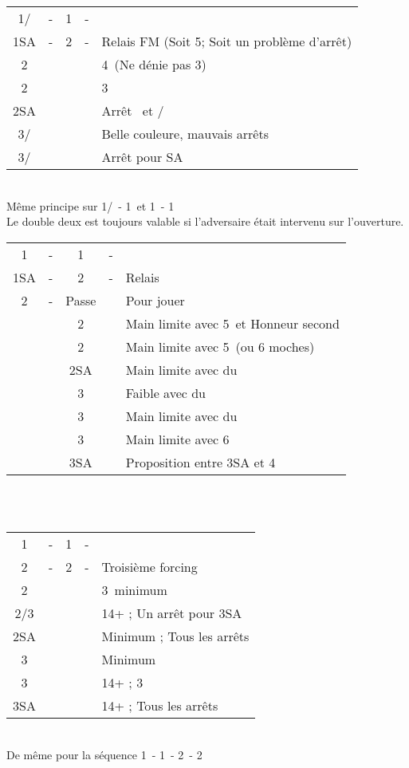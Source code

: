 \documentclass[a4paper, oneside, 11pt]{report}
\begin{document}
		\begin{tabular}{cccc|l}
		1\trefle/\carreau & - & 1\pique & - &\\
		1SA & - & 2\carreau & - & Relais FM (Soit 5\pique ; Soit un problème d'arrêt)\\
		2\coeur &&&& 4\coeur\ (Ne dénie pas 3\pique)\\
		2\pique &&&& 3\pique\\
		2SA &&&& Arrêt \coeur\ et \carreau/\trefle\\
		3\trefle/\carreau &&&& Belle couleure, mauvais arrêts\\
		3\carreau/\trefle &&&& Arrêt pour SA\\
		\end{tabular}\\
		Même principe sur 1\trefle/\carreau\ - 1\coeur\ et 1\coeur\ - 1\pique\\

		Le double deux est toujours valable si l'adversaire était intervenu sur l'ouverture. \\

		\begin{tabular}{cccc|l}
		1\coeur & - & 1\pique & - &\\
		1SA & - & 2\trefle & - & Relais\\
		2\carreau & - & Passe && Pour jouer\\
		&& 2\coeur && Main limite avec 5\pique\ et Honneur second \coeur\\
		&& 2\pique && Main limite avec 5\pique\ (ou 6 moches)\\
		&& 2SA && Main limite avec du \trefle\\
		&& 3\trefle && Faible avec du \trefle\\
		&& 3\carreau && Main limite avec du \carreau\\
		&& 3\pique && Main limite avec 6\pique\\
		&& 3SA && Proposition entre 3SA et 4\pique\\
		\end{tabular}\\\\
	
		\begin{tabular}{cccc|l}
		1\trefle & - & 1\coeur & - &\\
		2\trefle & - & 2\carreau & - & Troisième forcing\\
		2\coeur &&&& 3\coeur\ minimum\\
		2\pique/3\carreau &&&& 14+ ; Un arrêt pour 3SA\\
		2SA &&&& Minimum ; Tous les arrêts\\
		3\trefle &&&& Minimum\\
		3\coeur &&&& 14+ ; 3\coeur\\
		3SA &&&& 14+ ; Tous les arrêts\\
		\end{tabular}\\
		De même pour la séquence 1\carreau\ - 1\pique\ - 2\carreau\ - 2\coeur\\
			
\end{document}
